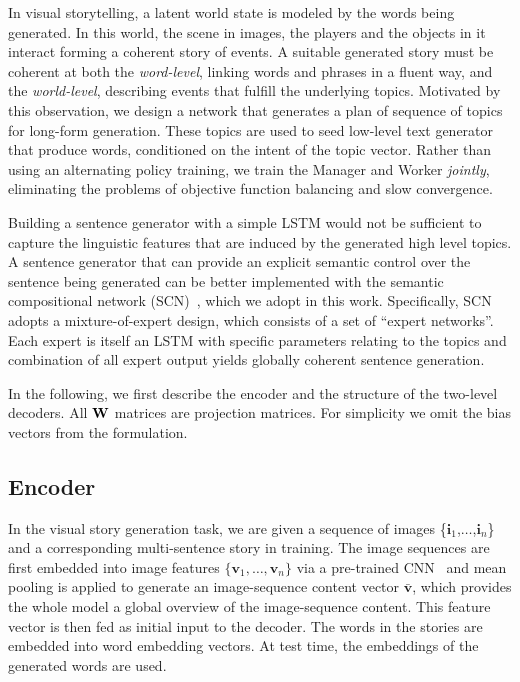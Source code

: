 \documentclass[letterpaper]{article} \usepackage{aaai19}  \usepackage{times}  \usepackage{helvet}  \usepackage{courier}  \usepackage{url}  \usepackage{graphicx}
\newcommand{\Wmat}{{\bf W}}
\newcommand{\vv}{{\boldsymbol v}}
\begin{document}
In visual storytelling, a latent world state is modeled by the words being generated. 
In this world, the scene in images, the players and the objects in it interact forming a coherent story of events.
A suitable generated story must be coherent at both the \textit{word-level}, linking words and phrases in a fluent way, and the \textit{world-level}, describing events that fulfill the underlying topics. Motivated by this observation, we design a network that generates a plan of sequence of topics for long-form generation. These topics are used to seed low-level text generator that produce words, conditioned on the intent of the topic vector. Rather than using an alternating policy training, we train the Manager and Worker \emph{jointly}, eliminating the problems of objective function balancing and slow convergence.

Building a sentence generator with a simple LSTM would not be sufficient to capture the linguistic features that are induced by the generated high level topics.  
A sentence generator that can provide an explicit semantic control over the sentence being generated can be better implemented with the semantic compositional network (SCN)~\cite{SCN_CVPR2017}, which we adopt in this work. 
Specifically, SCN adopts a mixture-of-expert design, which consists of a set of ``expert networks''. Each expert is itself an LSTM with specific parameters relating to the topics and combination of all expert output yields globally coherent sentence generation.

In the following, we first describe the encoder and the structure of the two-level decoders.
All $\Wmat$ matrices are projection matrices. For simplicity we omit the bias vectors from the formulation.

\subsection{Encoder}
In the visual story generation task, we are given a sequence of images \{$\mathbf{i}_1$,$\dots$,$\mathbf{i}_n$\} and a corresponding multi-sentence story in training. The image sequences are first embedded into image features $\{\vv_1,\ldots,\vv_n\}$ via a pre-trained CNN~\cite{he2016deep} and mean pooling is applied to generate an image-sequence content vector $\bar{\vv}$, which provides the whole model a global overview of the image-sequence content. This feature vector is then fed as initial input to the decoder. The words in the stories are embedded into word embedding vectors. At test time, the embeddings of the generated words are used.
\end{document}
